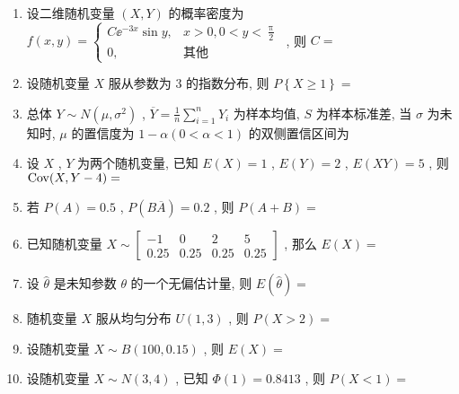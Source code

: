 \begin{enumerate}
	\item 设二维随机变量 $(X,Y)$ 的概率密度为 $f(x,y)=
	\begin{cases}
	 C\ee^{-3x}\sin y, & x>0, 0<y<\frac{\uppi}{2}\\
	0, & \text{其他}
	\end{cases}
	$ , 则 $C=$
	
	\underline{\hspace{8pc}}

	\item 设随机变量 $X$ 服从参数为 $3$ 的指数分布, 则 $P\left\{X\geqslant  1\right\}=$\underline{\hspace{8pc}}

	\item 总体 $Y\sim N\left(\mu,\sigma^2\right)$ , $\overline{Y}=\frac{1}{n}\sum_{i=1}^{n}Y_i$ 为样本均值, $S$ 为样本标准差, 当 $\sigma$ 为未知时, $\mu$ 的置信度为 $1-\alpha (0<\alpha<1)$ 的双侧置信区间为\underline{\hspace{8pc}}

	\item 设 $X$ , $Y$ 为两个随机变量, 已知 $E(X)=1$ , $E(Y)=2$ , $E(XY)=5$ , 则 $\mathrm{Cov}(X,Y-4)=$
	
	\underline{\hspace{8pc}}
	
	\item 若 $P(A)=0.5$ , $P\left(B\overline{A}\right)=0.2$ , 则 $P(A+B)=$\underline{\hspace{8pc}}
	
	\item 已知随机变量 $X\sim
	\begin{bmatrix}
	-1 & 0 & 2 & 5\\
	0.25 & 0.25 & 0.25 & 0.25
	\end{bmatrix}
	$ , 那么 $E(X)=$\underline{\hspace{8pc}}
	
	\item 设 $\hat\theta$ 是未知参数 $\theta$ 的一个无偏估计量, 则 $E(\hat\theta)=$\underline{\hspace{8pc}}

	\item 随机变量 $X$ 服从均匀分布 $U(1,3)$ , 则 $P(X>2)=$\underline{\hspace{8pc}}
	
	\item 设随机变量 $X\sim B(100,0.15)$ , 则 $E(X)=$\underline{\hspace{8pc}}
	
	\item 设随机变量 $X\sim N(3,4)$ , 已知 $\varPhi(1)=0.8413$ , 则 $P(X<1)=$\underline{\hspace{8pc}}
	

\end{enumerate}
